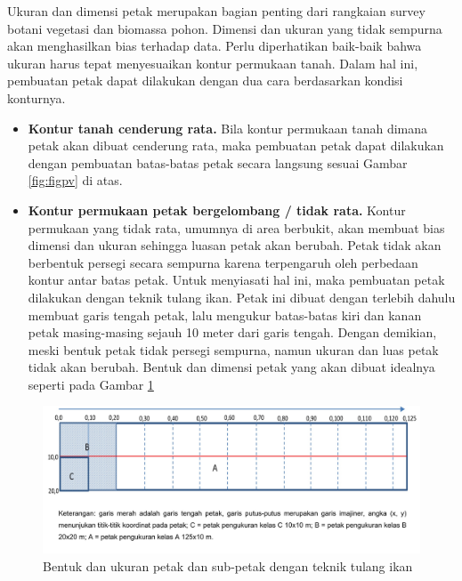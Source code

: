 \documentclass[
  oneside]{book}
\providecommand{\tightlist}{%
  \setlength{\itemsep}{0pt}\setlength{\parskip}{0pt}}
\begin{document}
Ukuran dan dimensi petak merupakan bagian penting dari rangkaian survey botani vegetasi dan biomassa pohon. Dimensi dan ukuran yang tidak sempurna akan menghasilkan bias terhadap data. Perlu diperhatikan baik-baik bahwa ukuran harus tepat menyesuaikan kontur permukaan tanah. Dalam hal ini, pembuatan petak dapat dilakukan dengan dua cara berdasarkan kondisi konturnya.

\begin{itemize}
\tightlist
\item
  \textbf{Kontur tanah cenderung rata.} Bila kontur permukaan tanah dimana petak akan dibuat cenderung rata, maka pembuatan petak dapat dilakukan dengan pembuatan batas-batas petak secara langsung sesuai Gambar \ref{fig:figpv} di atas.
\item
  \textbf{Kontur permukaan petak bergelombang / tidak rata.} Kontur permukaan yang tidak rata, umumnya di area berbukit, akan membuat bias dimensi dan ukuran sehingga luasan petak akan berubah. Petak tidak akan berbentuk persegi secara sempurna karena terpengaruh oleh perbedaan kontur antar batas petak. Untuk menyiasati hal ini, maka pembuatan petak dilakukan dengan teknik tulang ikan. Petak ini dibuat dengan terlebih dahulu membuat garis tengah petak, lalu mengukur batas-batas kiri dan kanan petak masing-masing sejauh 10 meter dari garis tengah. Dengan demikian, meski bentuk petak tidak persegi sempurna, namun ukuran dan luas petak tidak akan berubah. Bentuk dan dimensi petak yang akan dibuat idealnya seperti pada Gambar \ref{fig:figtiv}
\end{itemize}

\begin{figure}

{\centering \includegraphics[width=1\linewidth]{images/tiv_ilustration} 

}

\caption{Bentuk dan ukuran petak dan sub-petak dengan teknik tulang ikan}\label{fig:figtiv}
\end{figure}
\end{document}
